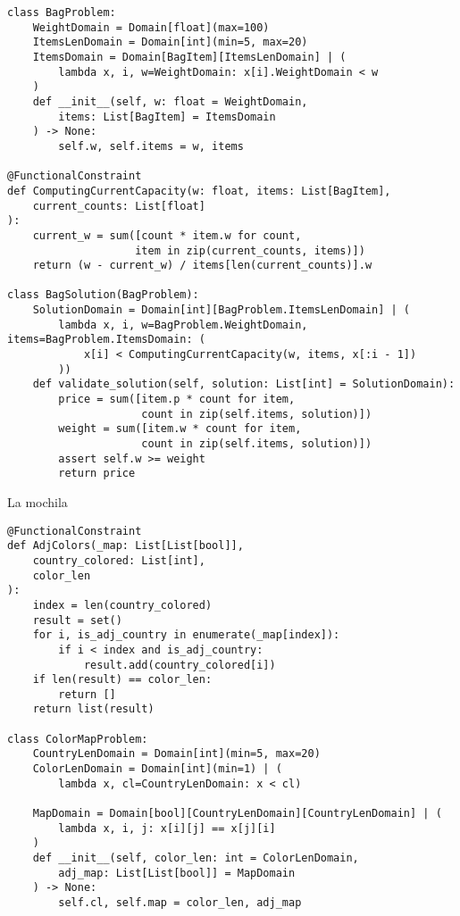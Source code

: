 \begin{codesample}
\begin{listing}[!ht]
\begin{verbatim}
class BagProblem:
    WeightDomain = Domain[float](max=100)
    ItemsLenDomain = Domain[int](min=5, max=20)
    ItemsDomain = Domain[BagItem][ItemsLenDomain] | (
        lambda x, i, w=WeightDomain: x[i].WeightDomain < w
    )
    def __init__(self, w: float = WeightDomain, 
        items: List[BagItem] = ItemsDomain
    ) -> None:
        self.w, self.items = w, items
    
@FunctionalConstraint
def ComputingCurrentCapacity(w: float, items: List[BagItem], 
    current_counts: List[float]
):
    current_w = sum([count * item.w for count,
                    item in zip(current_counts, items)])
    return (w - current_w) / items[len(current_counts)].w

class BagSolution(BagProblem):
    SolutionDomain = Domain[int][BagProblem.ItemsLenDomain] | (
        lambda x, i, w=BagProblem.WeightDomain, items=BagProblem.ItemsDomain: (
            x[i] < ComputingCurrentCapacity(w, items, x[:i - 1])
        ))
    def validate_solution(self, solution: List[int] = SolutionDomain):
        price = sum([item.p * count for item,
                     count in zip(self.items, solution)])
        weight = sum([item.w * count for item,
                     count in zip(self.items, solution)])
        assert self.w >= weight
        return price

    \end{verbatim}
    \caption{La mochila}
    \label{lst:bag}
\end{listing}



\begin{listing}[!ht]
    \begin{verbatim}
@FunctionalConstraint
def AdjColors(_map: List[List[bool]], 
    country_colored: List[int], 
    color_len
):
    index = len(country_colored)
    result = set()
    for i, is_adj_country in enumerate(_map[index]):
        if i < index and is_adj_country:
            result.add(country_colored[i])
    if len(result) == color_len:
        return []
    return list(result)

class ColorMapProblem:
    CountryLenDomain = Domain[int](min=5, max=20)
    ColorLenDomain = Domain[int](min=1) | (
        lambda x, cl=CountryLenDomain: x < cl)

    MapDomain = Domain[bool][CountryLenDomain][CountryLenDomain] | (
        lambda x, i, j: x[i][j] == x[j][i]
    )
    def __init__(self, color_len: int = ColorLenDomain, 
        adj_map: List[List[bool]] = MapDomain
    ) -> None:
        self.cl, self.map = color_len, adj_map


\end{verbatim}
\end{listing}
\end{codesample}
